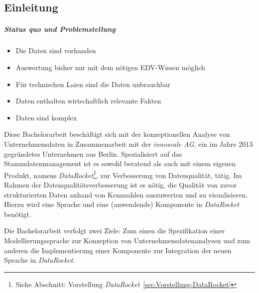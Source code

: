 \documentclass[
  language=german, %
  type=bachelor%
]{isthesis}
\begin{document}
\begin{content}



  \chapter{Einleitung}


  \paragraph{Status quo und Problemstellung}
  \begin{itemize}
    \item Die Daten sind vorhanden
    \item Auswertung bisher nur mit dem nötigen EDV-Wissen möglich
    \item Für technischen Laien sind die Daten unbrauchbar
    \item Daten enthalten wirtschaftlich relevante Fakten
    \item Daten sind komplex
  \end{itemize}

  Diese Bachelorarbeit beschäftigt sich mit der
  konzeptionellen Analyse von Unternehmensdaten in Zusammenarbeit mit der
  \textit{innoscale AG}, ein im Jahre 2013 gegründetes Unternehmen aus Berlin.
  Spezialisiert auf das Stammdatenmanagement ist es sowohl beratend als auch
  mit einem eigenen Produkt, namens \textit{DataRocket}\footnote{Siehe
  Abschnitt: Vorstellung \textit{DataRocket}~\ref{sec:Vorstellung-DataRocket}}, zur
  Verbesserung von Datenqualität, tätig. Im Rahmen der
  Datenqualitätsverbesserung ist es nötig, die Qualität von zuvor
  strukturierten Daten anhand von Kennzahlen auszuwerten und zu visualisieren.
  Hierzu wird eine Sprache und eine (anwendende) Komponente in \textit{DataRocket}
  benötigt.

  Die Bachelorarbeit verfolgt zwei Ziele: Zum einen die Spezifikation einer
  Modellierungssprache zur Konzeption von Unternehmensdatenanalysen und zum
  anderen die Implementierung einer Komponente zur
  Integration der neuen Sprache in \textit{DataRocket}.


\end{content}
\end{document}
